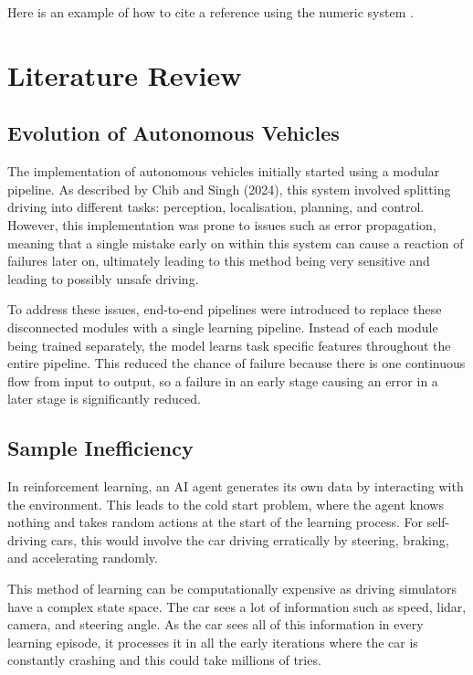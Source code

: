 Here is an example of how to cite a reference using the numeric system \cite{parikh1980adaptive}.


\section{Literature Review}

\subsection{Evolution of Autonomous Vehicles}
The implementation of autonomous vehicles initially started using a modular pipeline. As described by Chib and Singh (2024), this system involved splitting driving into different tasks: perception, localisation, planning, and control. However, this implementation was prone to issues such as error propagation, meaning that a single mistake early on within this system can cause a reaction of failures later on, ultimately leading to this method being very sensitive and leading to possibly unsafe driving.

To address these issues, end-to-end pipelines were introduced to replace these disconnected modules with a single learning pipeline. Instead of each module being trained separately, the model learns task specific features throughout the entire pipeline. This reduced the chance of failure because there is one continuous flow from input to output, so a failure in an early stage causing an error in a later stage is significantly reduced.

\subsection{Sample Inefficiency}
In reinforcement learning, an AI agent generates its own data by interacting with the environment. This leads to the cold start problem, where the agent knows nothing and takes random actions at the start of the learning process. For self-driving cars, this would involve the car driving erratically by steering, braking, and accelerating randomly.

This method of learning can be computationally expensive as driving simulators have a complex state space. The car sees a lot of information such as speed, lidar, camera, and steering angle. As the car sees all of this information in every learning episode, it processes it in all the early iterations where the car is constantly crashing and this could take millions of tries.

